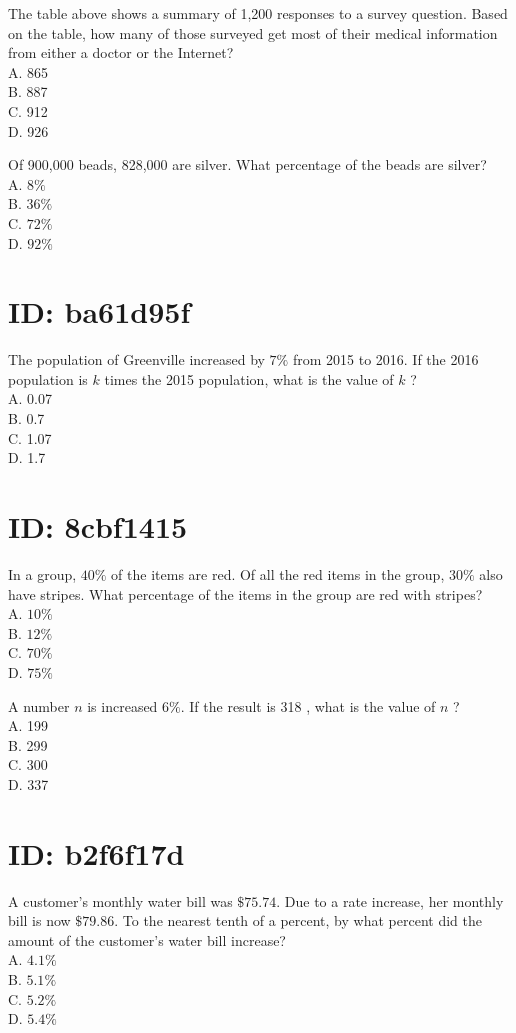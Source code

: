 The table above shows a summary of 1,200 responses to a survey question. Based on the table, how many of those surveyed get most of their medical information from either a doctor or the Internet?\\
A. 865\\
B. 887\\
C. 912\\
D. 926

Of 900,000 beads, 828,000 are silver. What percentage of the beads are silver?\\
A. $8 \%$\\
B. $36 \%$\\
C. $72 \%$\\
D. $92 \%$

\section*{ID: ba61d95f}
The population of Greenville increased by $7 \%$ from 2015 to 2016. If the 2016 population is $k$ times the 2015 population, what is the value of $k$ ?\\
A. 0.07\\
B. 0.7\\
C. 1.07\\
D. 1.7

\section*{ID: 8cbf1415}
In a group, $40 \%$ of the items are red. Of all the red items in the group, $30 \%$ also have stripes. What percentage of the items in the group are red with stripes?\\
A. $10 \%$\\
B. $12 \%$\\
C. $70 \%$\\
D. $75 \%$

A number $n$ is increased $6 \%$. If the result is 318 , what is the value of $n$ ?\\
A. 199\\
B. 299\\
C. 300\\
D. 337

\section*{ID: b2f6f17d}
A customer's monthly water bill was $\$ 75.74$. Due to a rate increase, her monthly bill is now $\$ 79.86$. To the nearest tenth of a percent, by what percent did the amount of the customer's water bill increase?\\
A. $4.1 \%$\\
B. $5.1 \%$\\
C. $5.2 \%$\\
D. $5.4 \%$

